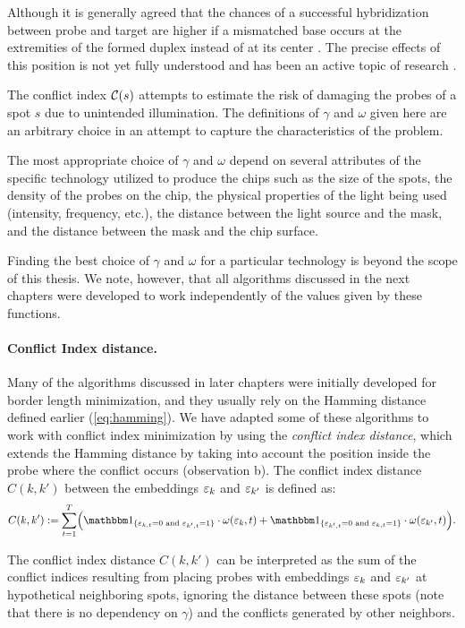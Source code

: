 Although it is generally agreed that the chances of a successful hybridization
between probe and target are higher if a mismatched base occurs at the
extremities of the formed duplex instead of at its center \citep{Hubbell1999}.
The precise effects of this position is not yet fully understood and has been an
active topic of research \citep{Binder2005}.

The conflict index ${\mathcal{C}}(s)$ attempts to estimate the risk of damaging the
probes of a spot $s$ due to unintended illumination. The definitions of $\gamma$
and $\omega$ given here are an arbitrary choice in an attempt to capture the
characteristics of the problem.

The most appropriate choice of $\gamma$ and $\omega$ depend on several
attributes of the specific technology utilized to produce the chips such as the
size of the spots, the density of the probes on the chip, the physical
properties of the light being used (intensity, frequency, etc.), the distance
between the light source and the mask, and the distance between the mask and the
chip surface.

Finding the best choice of $\gamma$ and $\omega$ for a particular technology is
beyond the scope of this thesis. We note, however, that all algorithms discussed
in the next chapters were developed to work independently of the values given by
these functions.

\paragraph{Conflict Index distance.}
Many of the algorithms discussed in later chapters were initially developed for
border length minimization, and they usually rely on the Hamming distance
defined earlier (\ref{eq:hamming}). We have adapted some of these algorithms to
work with conflict index minimization by using the \emph{conflict index
distance}, which extends the Hamming distance by taking into account the
position inside the probe where the conflict occurs (observation b). The
conflict index distance $C(k,k')$ between the embeddings $\varepsilon_k$ and
$\varepsilon_{k'}$ is defined as:
\begin{equation}
\label{eq:ci_dist}
C(k,k') := \sum_{t=1}^{T}
  \Bigl(
    \Ind{\eps_{k,t}=0 \text{ and } \eps_{k',t}=1}
    \cdot \omega(\eps_{k},t)
    +
    \Ind{\eps_{k',t}=0 \text{ and } \eps_{k,t}=1}
    \cdot \omega(\eps_{k'},t)
  \Bigr).
\end{equation}

The conflict index distance $C(k,k')$ can be interpreted as the sum of the
conflict indices resulting from placing probes with embeddings $\varepsilon_k$ and
$\varepsilon_{k'}$ at hypothetical neighboring spots, ignoring the distance between
these spots (note that there is no dependency on $\gamma$) and the conflicts
generated by other neighbors.

